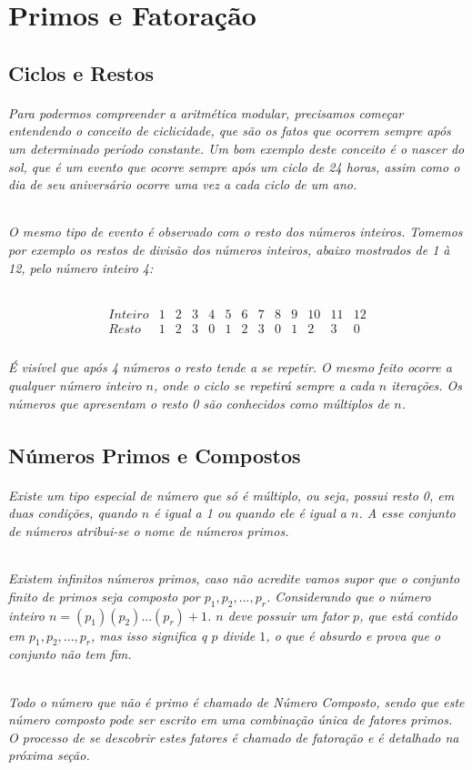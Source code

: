\chapter {Primos e Fatora\c{c}\~ao}
\label{Num}

\section{Ciclos e Restos}	
\subparagraph{
Para podermos compreender a aritm\'etica modular, precisamos come\c{c}ar entendendo o conceito de ciclicidade, que s\~ao os fatos que ocorrem sempre ap\'os um determinado per\'iodo constante. Um bom exemplo deste conceito \'e o nascer do sol, que \'e um evento que ocorre sempre ap\'os um ciclo de {24} horas, assim como o dia de seu anivers\'ario ocorre uma vez a cada ciclo de um ano.
}
\subparagraph{
O mesmo tipo de evento \'e observado com o resto dos n\'umeros inteiros. Tomemos por exemplo os restos de divis\~ao dos n\'umeros inteiros, abaixo mostrados de 1 \`a 12, pelo n\'umero inteiro {4}:
}

\[
\begin{array}{ccccccccccccc}
  {Inteiro} & 1 & 2 & 3 & 4 & 5 & 6 & 7 & 8 & 9 & 10 &  11 & 12 \\  
	{Resto} & 1 & 2 & 3 & 0 & 1 & 2 & 3 & 0 & 1 & 2  &  3 & 0 \\ 
\end{array}
\]

\subparagraph{
\'E vis\'ivel que ap\'os {4} n\'umeros o resto tende a se repetir. O mesmo feito ocorre a qualquer n\'umero inteiro $n$, onde o ciclo se repetir\'a sempre a cada $n$ itera\c{c}\~oes. Os n\'umeros que apresentam o resto {0} s\~ao conhecidos como m\'ultiplos de $n$.
}

\section{N\'{u}meros Primos e Compostos}

\subparagraph{
Existe um tipo especial de n\'umero que s\'o \'e m\'ultiplo, ou seja, possui resto {0}, em duas condi\c{c}\~oes, quando $n$ \'e igual a {1} ou quando ele \'e igual a $n$. A esse conjunto de n\'umeros atribui-se o nome de \textit{n\'umeros primos}.
}
\subparagraph{
\textit{Existem infinitos n\'umeros primos}, caso n\~ao acredite vamos supor que o conjunto finito de primos seja composto por $p_{1},  p_{2}, ..., p_{r} $. Considerando que o n\'umero inteiro $n=(p_{1})(p_{2})...(p_{r}) + 1$. $n$ deve possuir um fator $p$, que est\'a contido em $p_{1},  p_{2}, ..., p_{r} $, mas isso significa q $p$ divide $1$, o que \'e absurdo e prova que o conjunto n\~ao tem fim.
}
\subparagraph{
Todo o n\'umero que n\~ao \'e primo \'e chamado de \textit{N\'umero Composto}, sendo que este n\'umero composto pode ser escrito em \textit {uma combina\c{c}\~ao \'unica de fatores primos}. O processo de se descobrir estes fatores \'e chamado de \textit{fatora\c{c}\~ao} e \'e detalhado na pr\'oxima seção.
}

